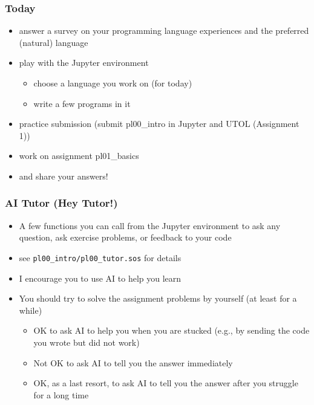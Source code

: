 \documentclass[12pt,dvipdfmx]{beamer}
\newcommand{\ao}[1]{{\color{blue}#1}}
\begin{document}
\begin{frame}
  \frametitle{Today}
  \begin{itemize}
  \item answer a survey on your programming language experiences
    and the preferred (natural) language
  \item play with the Jupyter environment
    \begin{itemize}
    \item choose a language you work on (for today)
    \item write a few programs in it
    \end{itemize}
  \item practice submission (submit \ao{pl00\_intro} in Jupyter and UTOL (Assignment 1))
  \item work on assignment \ao{pl01\_basics}
  \item and share your answers!
  \end{itemize}
\end{frame}

\begin{frame}
  \frametitle{AI Tutor (Hey Tutor!)}
  \begin{itemize}
  \item A few functions you can call from the Jupyter environment to ask any question, ask exercise problems, or feedback to your code
  \item see {\tt pl00\_intro/pl00\_tutor.sos} for details
  \item I encourage you to use AI to help you learn
  \item You should try to solve the assignment problems by yourself (at least for a while)
    \begin{itemize}
    \item OK to ask AI to help you when you are stucked (e.g., by sending the code you wrote but did not work)
    \item Not OK to ask AI to tell you the answer immediately
    \item OK, as a last resort, to ask AI to tell you the answer after you struggle for a long time
    \end{itemize}
  \end{itemize}
\end{frame}
\end{document}
